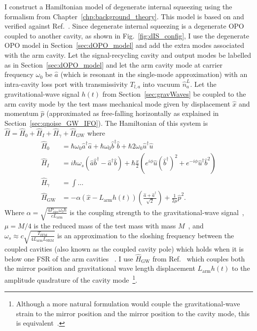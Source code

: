 I construct a Hamiltonian model of degenerate internal squeezing using the formalism from Chapter~\ref{chp:background_theory}. This model is based on and verified against Ref.~\cite{Korobko2019}. %
Since degenerate internal squeezing is a degenerate OPO coupled to another cavity, as shown in Fig.~\ref{fig:dIS_config}, I use the degenerate OPO model in Section~\ref{sec:dOPO_model} and add the extra modes associated with the arm cavity. Let the signal-recycling cavity and output modes be labelled as in Section~\ref{sec:dOPO_model} and let the arm cavity mode at carrier frequency $\omega_0$ be $\hat a$ (which is resonant in the single-mode approximation) with an intra-cavity loss port with transmissivity $T_{l,a}$ into vacuum $\hat n^L_a$. Let the gravitational-wave signal $h(t)$ from Section~\ref{sec:gravWaves} be coupled to the arm cavity mode by the test mass mechanical mode given by displacement $\hat x$ and momentum $\hat p$ (approximated as free-falling horizontally as explained in Section~\ref{sec:qnoise_GW_IFO}). 
The Hamiltonian of this system is $\hat H = \hat H_0 + \hat H_I + \hat H_\gamma + \hat H_\text{GW}$ where~\cite{}
\begin{align}
\hat H_0 &= \hbar \omega_0 \hat a^\dag \hat a + \hbar \omega_0 \hat b^\dag \hat b + \hbar 2\omega_0 \hat u^\dag \hat u\\
\hat H_I &= i\hbar\omega_s(\hat a\hat b^\dag-\hat a^\dag\hat b) +\hbar \frac{x}{2} (e^{i\phi} \hat u (\hat b^\dag)^2 + e^{-i\phi} \hat u^\dag \hat b^2)\\
\hat H_\gamma &= \int \ldots \\
\hat H_\text{GW} &= -\alpha (\hat{x}-L_\mathrm{arm}h(t))(\frac{\hat{a}+\hat{a}^\dag}{\sqrt{2}})+\frac{1}{2\mu}\hat{p}^2.
\end{align}
Where $\alpha=\sqrt{\frac{4 P_\text{circ} \omega_0 \hbar}{c  L_\text{arm}}}$  is the coupling strength to the gravitational-wave signal~\cite{}, $\mu=M/4$ is the reduced mass of the test mass with mass $M$~\cite{}, and $\omega_s\approx c\sqrt{\frac{T_\text{ITM}}{4 L_\text{arm} L_\text{SRM}}}$ is an approximation to the sloshing frequency between the coupled cavities (also known as the coupled cavity pole) which holds when it is below one FSR of the arm cavities ~\cite{}. I use $\hat H_\text{GW}$ from Ref.~\cite{Li2020,original source?} which  couples both the mirror position and gravitational wave length displacement $L_\text{arm} h(t)$ to the amplitude quadrature of the cavity mode~\footnote{Although a more natural formulation would couple the gravitational-wave strain to the mirror position and the mirror position to the cavity mode, this is equivalent~\cite{}.}. 				
